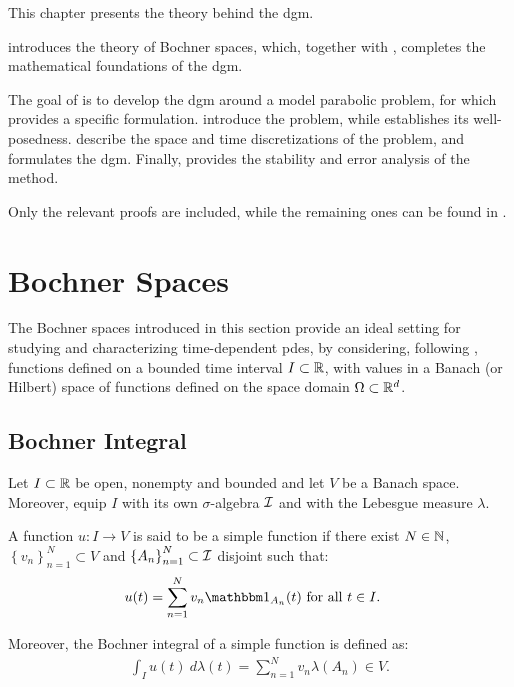 This chapter presents the theory behind the \acrlong{dgm}.

 introduces the theory of Bochner spaces, which, together with , completes the mathematical foundations of the \acrshort{dgm}.

The goal of  is to develop the \acrshort{dgm} around a model parabolic problem, for which  provides a specific formulation.  introduce the problem, while  establishes its well-posedness.  describe the space and time discretizations of the problem, and  formulates the \acrshort{dgm}. Finally,  provides the stability and error analysis of the method.

Only the relevant proofs are included, while the remaining ones can be found in .

\section{Bochner Spaces} \label{sec:bochner}

The Bochner spaces introduced in this section provide an ideal setting for studying and characterizing time-dependent \acrshort{pdes}, by considering, following \cite[p.~111]{Ern2021}, functions defined on a bounded time interval $I \subset \mathbb{R}$, with values in a Banach (or Hilbert) space of functions defined on the space domain $\Omega \subset \mathbb{R}^{d}$.

\subsection{Bochner Integral}

Let $I \subset \mathbb{R}$ be open, nonempty and bounded and let $V$ be a Banach space. Moreover, equip $I$ with its own $\sigma$-algebra $\mathcal{I}$ and with the Lebesgue measure $\lambda$.

\begin{definition}
    A function $u\colon I \rightarrow V$ is said to be a simple function if there exist $N \in \mathbb{N}$, $\left\{ v_n \right\}_{n = 1}^N \subset V$ and $\left\{ A_n \right\}_{n = 1}^N \subset \mathcal{I}$ disjoint such that:
    \begin{align}
        u(t) = \sum_{n = 1}^N v_n \Characteristic{A_n}(t) &\text{ for all } t \in I.
    \end{align}

    Moreover, the Bochner integral of a simple function is defined as:
    \begin{align}
        \int_I u(t) ~ d \lambda(t)  = \sum_{n = 1}^N v_n \lambda(A_n) \in V.
    \end{align}
\end{definition}

